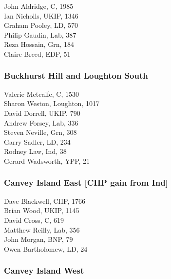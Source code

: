 \documentclass[a4paper,openany,10pt]{book}
\begin{document}


John Aldridge, C, 1985\\
Ian Nicholls, UKIP, 1346\\
Graham Pooley, LD, 570\\
Philip Gaudin, Lab, 387\\
Reza Hossain, Grn, 184\\
Claire Breed, EDP, 51\\


\subsubsection*{Buckhurst Hill and Loughton South}



Valerie Metcalfe, C, 1530\\
Sharon Weston, Loughton, 1017\\
David Dorrell, UKIP, 790\\
Andrew Forsey, Lab, 336\\
Steven Neville, Grn, 308\\
Garry Sadler, LD, 234\\
Rodney Law, Ind, 38\\
{Gerard Wadsworth}, YPP, 21\\


\subsubsection*{Canvey Island East \hspace*{\fill}\nolinebreak[1]%
\enspace\hspace*{\fill}
[CIIP gain from Ind]}



Dave Blackwell, CIIP, 1766\\
Brian Wood, UKIP, 1145\\
David Cross, C, 619\\
Matthew Reilly, Lab, 356\\
John Morgan, BNP, 79\\
Owen Bartholomew, LD, 24\\


\subsubsection*{Canvey Island West}
\end{document}
